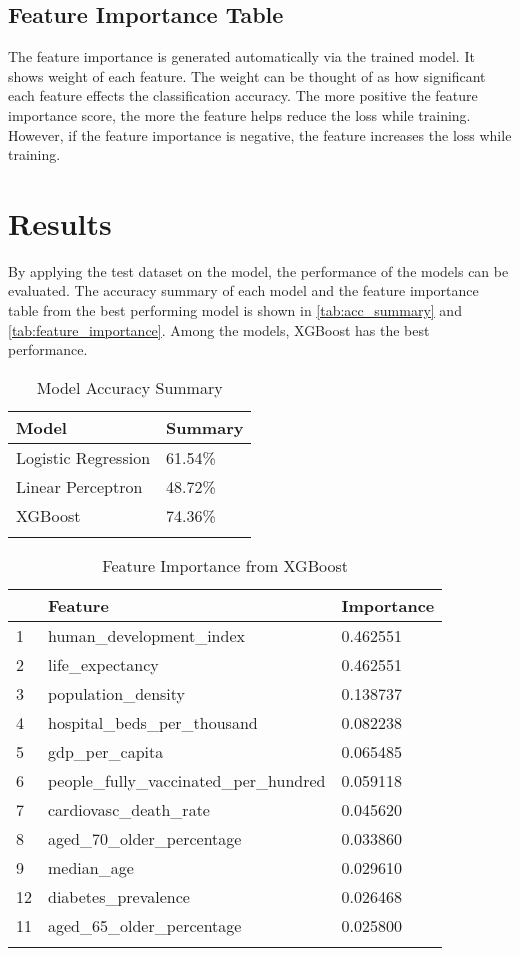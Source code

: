 \documentclass[10pt, a4paper, twocolumn]{article} %
\begin{document}
\subsection{Feature Importance Table}
The feature importance is generated automatically via the trained model. It shows weight of each feature. The weight can 
be thought of as how significant each feature effects the classification accuracy. The more positive the feature importance 
score, the more the feature helps reduce the loss while training. However, if the feature importance is negative, the feature 
increases the loss while training.
\section{Results}
By applying the test dataset on the model, the performance of the models can be evaluated. The accuracy summary of each 
model and the feature importance table from the best performing model is shown in \autoref{tab:acc_summary} and 
\autoref{tab:feature_importance}. Among the models, XGBoost has the best performance.
\begin{table}
	\caption{Model Accuracy Summary}
	\centering
	\begin{tabular}{ll}
		\toprule
		\textbf{Model} & \textbf{Summary} \\
		\midrule
		Logistic Regression & 61.54\% \\
		Linear Perceptron & 48.72\% \\
		XGBoost & 74.36\% \\
		\bottomrule
	\label{tab:acc_summary}
	\end{tabular}
\end{table}
\begin{table}
	\caption{Feature Importance from XGBoost}
	\centering
	\begin{tabular}{lll}
		\toprule
		& \textbf{Feature} & \textbf{Importance} \\
		\midrule
		1&human\_development\_index & 0.462551 \\
		2& life\_expectancy& 0.462551\\
		3& population\_density& 0.138737\\
		4& hospital\_beds\_per\_thousand& 0.082238\\
		5& gdp\_per\_capita& 0.065485\\
		6& people\_fully\_vaccinated\_per\_hundred& 0.059118\\
		7& cardiovasc\_death\_rate& 0.045620\\
		8& aged\_70\_older\_percentage& 0.033860\\
		9& median\_age& 0.029610\\
		12& diabetes\_prevalence& 0.026468\\
		11& aged\_65\_older\_percentage& 0.025800\\
		\bottomrule
	\label{tab:feature_importance}
	\end{tabular}
\end{table}
\end{document}

